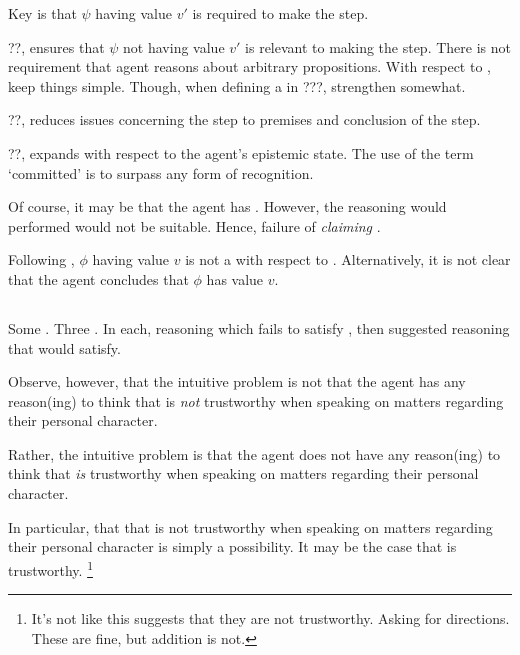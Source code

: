 \begin{note}
  Key is that \(\psi\) having value \(v'\) is required to make the step.

  ??, ensures that \(\psi\) not having value \(v'\) is relevant to making the step.
  There is not requirement that agent reasons about arbitrary \epVAd{} propositions.
  With respect to \ideaCS{}, keep things simple.
  Though, when defining a \requ{} in ???, strengthen somewhat.

  ??, reduces issues concerning the step to premises and conclusion of the step.

  ??, expands with respect to the agent's epistemic state.
  The use of the term `committed' is to surpass any form of recognition.
\end{note}

\begin{note}
  Of course, it may be that the agent has \support{}.
  However, the reasoning would performed would not be suitable.
  Hence, failure of \emph{claiming} \support{}.

  Following \ideaS{}, \(\phi\) having value \(v\) is not a \sink{} with respect to .
  Alternatively, it is not clear that the agent concludes that \(\phi\) has value \(v\).
\end{note}

\subsection{}

\begin{note}
  Some .
  Three .
  In each, reasoning which fails to satisfy \ideaCS{}, then suggested reasoning that would satisfy.
\end{note}



\begin{note}
  Observe, however, that the intuitive problem is not that the agent has any reason(ing) to think that  is \emph{not} trustworthy when speaking on matters regarding their personal character.

  Rather, the intuitive problem is that the agent does not have any reason(ing) to think that  \emph{is} trustworthy when speaking on matters regarding their personal character.

  In particular, that that  is not trustworthy when speaking on matters regarding their personal character is simply a possibility.
  It may be the case that  is trustworthy.\nolinebreak
  \footnote{
    \color{red}
    It's not like this suggests that they are not trustworthy.
    Asking for directions.
    These are fine, but addition is not.
  }
\end{note}

